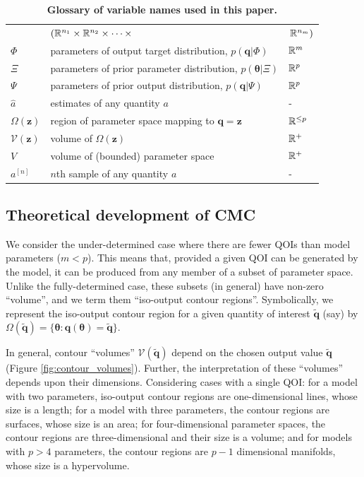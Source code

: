 \begin{table}[htbp]
\begin{adjustwidth}{-0.6in}{0in}
\begin{tabularx}{1.2\textwidth}{lll}
& \hfill $\left( \mathbb{R}^{n_1} \times \mathbb{R}^{n_2}\times \dots \times \right.$ & $\left. \mathbb{R}^{n_m} \right)$ \\
$\Phi$ & parameters of output target distribution, $p(\boldsymbol{q}|\Phi)$              & $\mathbb{R}^m$ \\
$\Xi$  & parameters of prior parameter distribution, $p(\boldsymbol{\theta}|\Xi)$        & $\mathbb{R}^p$ \\
$\Psi$ & parameters of prior output distribution, $p(\boldsymbol{q}|\Psi)$               & $\mathbb{R}^p$ \\
$\hat{a}$ & estimates of any quantity $a$                                                                  & - \\
$\Omega(\boldsymbol{z})$              & region of parameter space mapping to $\boldsymbol{q}=\boldsymbol{z}$         & $\mathbb{R}^{\leq p}$ \\
$\mathcal{V}(\boldsymbol{z})$         & volume of $\Omega(\boldsymbol{z})$                                 & $\mathbb{R}^+$ \\
$V$                                   & volume of (bounded) parameter space                                          & $\mathbb{R}^+$ \\
$a^{[n]}$ & $n$th sample of any quantity $a$ & -\\
\end{tabularx}
\caption{\textbf{Glossary of variable names used in this paper.}}
\label{tab:variable_glossary}
\end{adjustwidth}
\end{table}




\subsection{Theoretical development of CMC}
We consider the under-determined case where there are fewer QOIs than model parameters ($m<p$). This means that, provided a given QOI can be generated by the model, it can be produced from any member of a subset of parameter space. Unlike the fully-determined case, these subsets (in general) have non-zero ``volume'', and we term them ``iso-output contour regions''. Symbolically, we represent the iso-output contour region for a given quantity of interest $\tilde{\boldsymbol{q}}$ (say) by $\Omega(\tilde{\boldsymbol{q}}) = \{\boldsymbol{\theta}: \boldsymbol{q}(\boldsymbol{\theta}) = \tilde{\boldsymbol{q}}\}$.

In general,  contour ``volumes'' $\mathcal{V}(\tilde{\boldsymbol{q}})$  depend on the chosen output value $\tilde{\boldsymbol{q}}$ (Figure \ref{fig:contour_volumes}). Further, the interpretation of these ``volumes'' depends upon their dimensions. Considering cases with a single QOI: for a model with two parameters, iso-output contour regions are one-dimensional lines, whose size is a length; for a model with three parameters, the contour regions are surfaces, whose size is an area; for four-dimensional parameter spaces, the contour regions are three-dimensional and their size is a volume; and for models with $p>4$ parameters, the contour regions are $p-1$ dimensional manifolds, whose size is a hypervolume.

